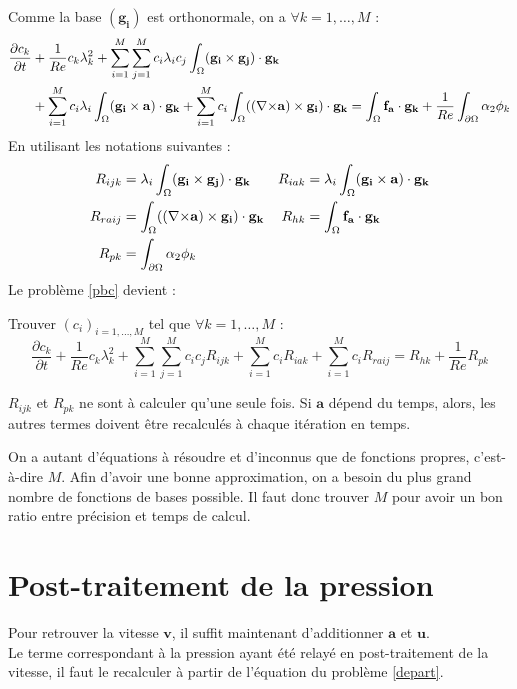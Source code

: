 Comme la base $(\mathbf{g_i})$ est orthonormale, on a $\forall k=1,\dots,M$ :
\begin{align*}
\frac{\partial c_k}{\partial t} &+ \frac{1}{Re}c_k\lambda_k^2 + \sum_{i=1}^M\sum_{j=1}^Mc_i\lambda_ic_j\int_\Omega(\mathbf{g_i}\times \mathbf{g_j})\cdot\mathbf{g_k}\\
& + \sum_{i=1}^Mc_i\lambda_i\int_\Omega(\mathbf{g_i}\times \mathbf{a})\cdot\mathbf{g_k} +  \sum_{i=1}^Mc_i\int_\Omega(({\nabla\times}\mathbf{a})\times \mathbf{g_i})\cdot\mathbf{g_k} = \int_\Omega\mathbf{f_a}\cdot\mathbf{g_k}+\frac{1}{Re}\int_{\partial\Omega} \alpha_2\phi_k\\
\end{align*}
En utilisant les notations suivantes :
\begin{align*}
R_{ijk} &= \lambda_i\int_\Omega(\mathbf{g_i}\times \mathbf{g_j})\cdot\mathbf{g_k} & R_{iak} &= \lambda_i\int_\Omega(\mathbf{g_i}\times \mathbf{a})\cdot\mathbf{g_k}\\
R_{raij} &= \int_\Omega(({\nabla\times}\mathbf{a})\times \mathbf{g_i})\cdot\mathbf{g_k} & R_{hk} &= \int_\Omega\mathbf{f_a}\cdot\mathbf{g_k}\\
R_{pk} &= \int_{\partial\Omega} \alpha_2\phi_k
\end{align*}
Le problème \ref{pbc} devient :
\begin{pb}\label{fvc}
Trouver $(c_i)_{i=1,\dots,M}$ tel que $\forall k=1,\dots,M$ :
\begin{equation*}
\frac{\partial c_k}{\partial t} + \frac{1}{Re}c_k\lambda_k^2 + \sum_{i=1}^M\sum_{j=1}^Mc_ic_jR_{ijk} + \sum_{i=1}^Mc_iR_{iak} + \sum_{i=1}^Mc_iR_{raij} = R_{hk} + \frac{1}{Re}R_{pk}
\end{equation*}\end{pb}

\begin{rk}
$R_{ijk}$ et $R_{pk}$ ne sont à calculer qu'une seule fois. Si $\mathbf{a}$ dépend du temps, alors, les autres termes doivent être recalculés à chaque itération en temps.
\end{rk}
\begin{rk}
On a autant d'équations à résoudre et d'inconnus que de fonctions propres, c'est-à-dire $M$. Afin d'avoir une bonne approximation, on a besoin du plus grand nombre de fonctions de bases possible. Il faut donc trouver $M$ pour avoir un bon ratio entre précision et temps de calcul.
\end{rk}

\section{Post-traitement de la pression}
\label{pression}
Pour retrouver la vitesse $\mathbf{v}$, il suffit maintenant d'additionner $\mathbf{a}$ et $\mathbf{u}$.\\
Le terme correspondant à la pression ayant été relayé en post-traitement de la vitesse, il faut le recalculer à partir de l'équation du problème \ref{depart}.

